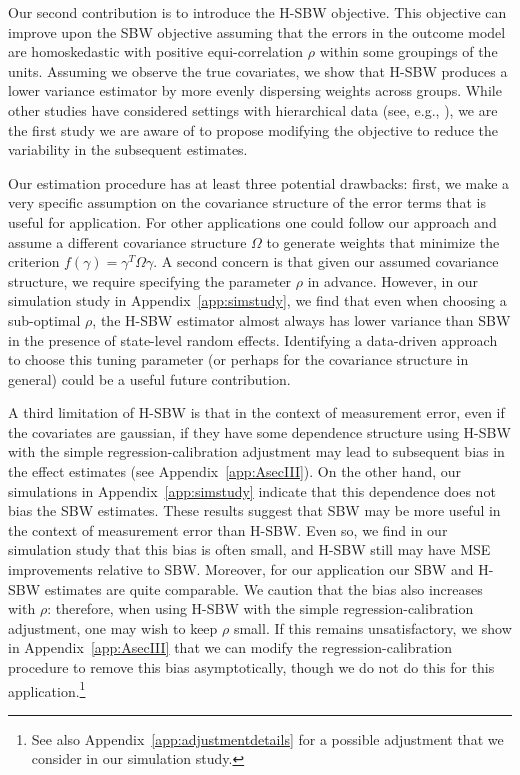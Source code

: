 \documentclass[aoas]{imsart}
\theoremstyle{plain}
\theoremstyle{remark}
\begin{document}
Our second contribution is to introduce the H-SBW objective. This objective can improve upon the SBW objective assuming that the errors in the outcome model are homoskedastic with positive equi-correlation $\rho$ within some groupings of the units. Assuming we observe the true covariates, we show that H-SBW produces a lower variance estimator by more evenly dispersing weights across groups. While other studies have considered settings with hierarchical data (see, e.g., \cite{keele2020hospital}), we are the first study we are aware of to propose modifying the objective to reduce the variability in the subsequent estimates.

Our estimation procedure has at least three potential drawbacks: first, we make a very specific assumption on the covariance structure of the error terms that is useful for application. For other applications one could follow our approach and assume a different covariance structure $\Omega$ to generate weights that minimize the criterion $f(\gamma) = \gamma^T\Omega\gamma$. A second concern is that given our assumed covariance structure, we require specifying the parameter $\rho$ in advance. However, in our simulation study in Appendix~\ref{app:simstudy}, we find that even when choosing a sub-optimal $\rho$, the H-SBW estimator almost always has lower variance than SBW in the presence of state-level random effects. Identifying a data-driven approach to choose this tuning parameter (or perhaps for the covariance structure in general) could be a useful future contribution.

A third limitation of H-SBW is that in the context of measurement error, even if the covariates are gaussian, if they have some dependence structure using H-SBW with the simple regression-calibration adjustment may lead to subsequent bias in the effect estimates (see Appendix~\ref{app:AsecIII}). On the other hand, our simulations in Appendix~\ref{app:simstudy} indicate that this dependence does not bias the SBW estimates. These results suggest that SBW may be more useful in the context of measurement error than H-SBW. Even so, we find in our simulation study that this bias is often small, and H-SBW still may have MSE improvements relative to SBW. Moreover, for our application our SBW and H-SBW estimates are quite comparable. We caution that the bias also increases with $\rho$: therefore, when using H-SBW with the simple regression-calibration adjustment, one may wish to keep $\rho$ small. If this remains unsatisfactory, we show in Appendix~\ref{app:AsecIII} that we can modify the regression-calibration procedure to remove this bias asymptotically, though we do not do this for this application.\footnote{See also Appendix~\ref{app:adjustmentdetails} for a possible adjustment that we consider in our simulation study.}
\end{document}
